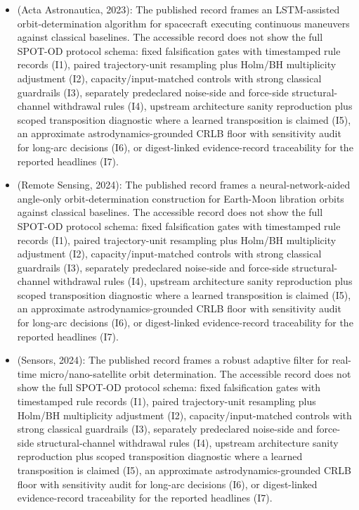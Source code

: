 \begin{itemize}[leftmargin=*]
  \item \cite{zhou2023lstm} (Acta Astronautica, 2023): The published record frames an LSTM-assisted orbit-determination algorithm for spacecraft executing continuous maneuvers against classical baselines. The accessible record does not show the full SPOT-OD protocol schema: fixed falsification gates with timestamped rule records (I1), paired trajectory-unit resampling plus Holm/BH multiplicity adjustment (I2), capacity/input-matched controls with strong classical guardrails (I3), separately predeclared noise-side and force-side structural-channel withdrawal rules (I4), upstream architecture sanity reproduction plus scoped transposition diagnostic where a learned transposition is claimed (I5), an approximate astrodynamics-grounded CRLB floor with sensitivity audit for long-arc decisions (I6), or digest-linked evidence-record traceability for the reported headlines (I7).
  \item \cite{zhang2024libration} (Remote Sensing, 2024): The published record frames a neural-network-aided angle-only orbit-determination construction for Earth-Moon libration orbits against classical baselines. The accessible record does not show the full SPOT-OD protocol schema: fixed falsification gates with timestamped rule records (I1), paired trajectory-unit resampling plus Holm/BH multiplicity adjustment (I2), capacity/input-matched controls with strong classical guardrails (I3), separately predeclared noise-side and force-side structural-channel withdrawal rules (I4), upstream architecture sanity reproduction plus scoped transposition diagnostic where a learned transposition is claimed (I5), an approximate astrodynamics-grounded CRLB floor with sensitivity audit for long-arc decisions (I6), or digest-linked evidence-record traceability for the reported headlines (I7).
  \item \cite{chen2024robust} (Sensors, 2024): The published record frames a robust adaptive filter for real-time micro/nano-satellite orbit determination. The accessible record does not show the full SPOT-OD protocol schema: fixed falsification gates with timestamped rule records (I1), paired trajectory-unit resampling plus Holm/BH multiplicity adjustment (I2), capacity/input-matched controls with strong classical guardrails (I3), separately predeclared noise-side and force-side structural-channel withdrawal rules (I4), upstream architecture sanity reproduction plus scoped transposition diagnostic where a learned transposition is claimed (I5), an approximate astrodynamics-grounded CRLB floor with sensitivity audit for long-arc decisions (I6), or digest-linked evidence-record traceability for the reported headlines (I7).

\end{itemize}
